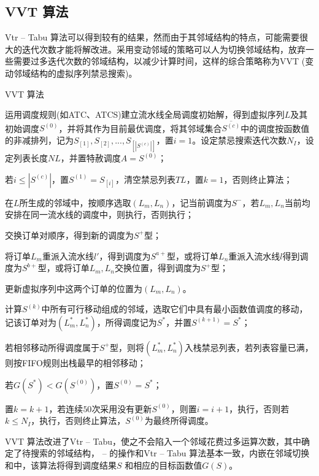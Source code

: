 \subsection{VVT 算法}
Vtr -- Tabu 算法可以得到较有的结果，然而由于其邻域结构的特点，可能需要很大的迭代次数才能将解改进。采用变动邻域的策略可以人为切换邻域结构，放弃一些需要过多迭代次数的邻域结构，以减少计算时间，这样的综合策略称为VVT (变动邻域结构的虚拟序列禁忌搜索)。
\begin{algori}
VVT 算法\label{alg:vvt}
\begin{asparaenum}
\renewcommand{\labelenumi}{\bf Step\theenumi~}
\item 运用调度规则(如ATC、ATCS)建立流水线全局调度初始解，得到虚拟序列$L$及其初始调度$S^{(0)}$，并将其作为目前最优调度，将其邻域集合$\overline{S^{(c)}}$中的调度按函数值的非减排列，记为$S_{[1]},S_{[2]},...,S_{[|S^{(c)}|]}$，置$i = 1$。设定禁忌搜索迭代次数$N_I$，设定列表长度$NL$，并置特赦调度$A = S^{(0)}$；
\item 若$i \le |S^{(c)}|$，置$S^{(1)} = S_{[i]}$，清空禁忌列表$TL$，置$k = 1$，否则终止算法；
\item 在$L$所生成的邻域中，按顺序选取$(L_m, L_n)$，记当前调度为$S^-$，若$L_m, L_n$当前均安排在同一流水线的调度中，则执行，否则执行；
\item 交换订单对顺序，得到新的调度为$S^+$型；
\item 将订单$L_m$重派入流水线$l'$，得到调度为$S^{a+}$型，或将订单$L_n$重派入流水线$l$得到调度为$S^{b+}$型，或将订单$L_m, L_n$交换位置，得到调度为$S^+$型；
\item 更新虚拟序列中这两个订单的位置为$(L_m, L_n)$。
\item 计算$S^{(k)}$中所有可行移动组成的邻域，选取它们中具有最小函数值调度的移动，记该订单对为$(L_m^*, L_n^*)$，所得调度记为$S^*$，并置$S^{(k+1)} = S^*$；
\item 若相邻移动所得调度属于$S^+$型，则将$(L_m^*, L_n^*)$入栈禁忌列表，若列表容量已满，则按FIFO规则出栈最早的相邻移动；
\item 若$G(S^*) < G(S^{(0)})$，置$S^{(0)} = S^*$；
\item 置$k = k + 1$，若连续$50$次采用没有更新$S^{(0)}$，则置$i = i+1$，执行，否则若$k\le N_I$，执行，否则终止算法，$S^{(0)}$为最终所得调度。
\end{asparaenum}
\end{algori}

VVT 算法改进了Vtr -- Tabu，使之不会陷入一个邻域花费过多运算次数，其中确定了待搜索的邻域结构， -- 的操作和Vtr -- Tabu 算法基本一致，内嵌在邻域切换和中，该算法将得到调度结果$S$ 和相应的目标函数值$G(S)$。
